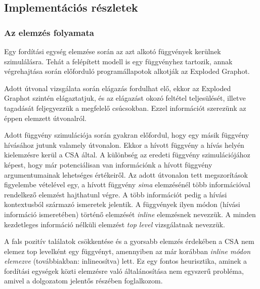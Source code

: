 \documentclass[oneside, a4paper, 12pt]{article}
\theoremstyle{definition}
\begin{document}
\subsection{Implementációs részletek}
\subsubsection{Az elemzés folyamata}
Egy fordítási egység elemzése során az azt alkotó függvények kerülnek
szimulálásra. Tehát a felépített modell is egy függvényhez tartozik,
annak végrehajtása során előforduló programállapotok alkotják az Exploded 
Graphot. 

Adott útvonal vizsgálata során elágazás fordulhat elő, ekkor az Exploded 
Graphot szintén elágaztatjuk,
és az elágazást okozó feltétel teljesülését, illetve tagadását feljegyezzük a 
megfelelő csúcsokban.
Ezzel információt szerezünk az éppen elemzett útvonalról.

Adott függvény szimulációja során gyakran előfordul, hogy egy másik függvény 
hívásához jutunk valamely útvonalon.
Ekkor a hívott függvény a hívás helyén kielemzésre kerül a CSA által.
A különbség az eredeti függvény szimulációjához képest, hogy már potenciálisan 
van információnk a hívott függvény argumentumainak lehetséges értékeiről.
Az adott útvonalon tett megszorítások figyelembe vételével egy, a hívott 
függvény \textit{sima} elemzésénél több információval rendelkező elemzést 
hajthatunl végre.
A több információt pedig a hívási kontextusból származó ismeretek jelentik.
A függvények ilyen módon (hívási információ ismeretében) történő elemzését 
\textit{inline} elemzésnek nevezzük.
A minden kezdetleges információ nélküli elemzést \textit{top level} 
vizsgálatnak nevezzük.

A fals pozitív találatok csökkentése és a gyorsabb elemzés érdekében a CSA nem 
elemez top levelként egy függvényt,
amennyiben az már korábban \textit{inline módon elemezve} (továbbiakban: 
inlineosítva) lett. Ez egy fontos 
heurisztika, aminek a fordítási egységek közti elemzésre való általánosítása 
nem egyszerű probléma, amivel
a dolgozatom jelentős részében foglalkozom.
\end{document}
